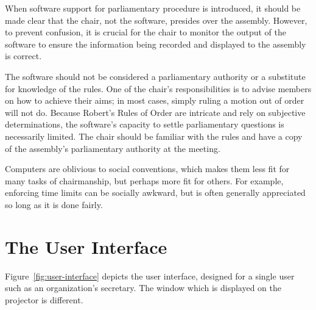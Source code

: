 \documentclass{book}
\begin{document}
When software support for parliamentary procedure is introduced, it should be made clear that the chair, not the software, presides over the assembly. 
However, to prevent confusion, it is crucial for the chair to monitor the output of the software to ensure the information being recorded and displayed to the assembly is correct.
   

The software should not be considered a parliamentary authority or a substitute for knowledge of the rules. One of the chair's responsibilities is to advise members on how to achieve their aims; in most cases, simply ruling a motion out of order will not do. Because Robert's Rules of Order are intricate and rely on subjective determinations, the software's capacity to settle parliamentary questions is necessarily limited. The chair should be familiar with the rules and have a copy of the assembly's parliamentary authority at the meeting.



Computers are oblivious to social conventions, which makes them less fit for many tasks of chairmanship, but perhaps more fit for others. For example, enforcing time limits can be socially awkward, but is often generally appreciated so long as it is done fairly.




\section{The User Interface}

Figure~\ref{fig:user-interface} depicts the user interface, designed for a single user such as an organization's secretary. The window which is displayed on the projector is different.
\end{document}
